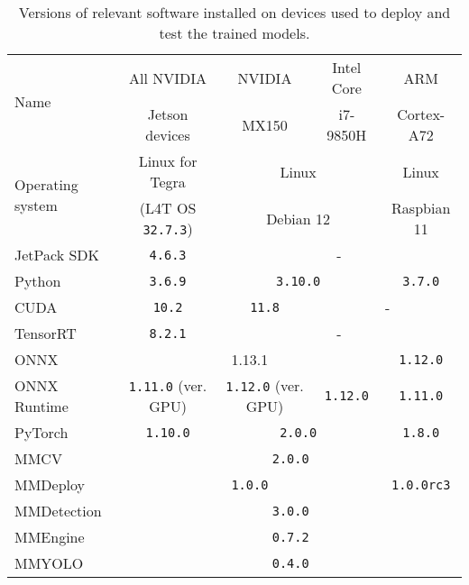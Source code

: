 \begin{table}[h]
\centering
\small
\begin{tabular}{|l|c|c|c|c|}
    \hline
    \multirow{2}{*}{Name} & All NVIDIA     & NVIDIA & Intel Core  & ARM \\
                          & Jetson devices & MX150  & i7-9850H    & Cortex-A72 \\
    \hline
    \multirow{2}{*}{Operating system} & Linux for Tegra             & \multicolumn{2}{c|}{Linux}     & Linux   \\
                                      & (L4T OS \texttt{32.7.3}) & \multicolumn{2}{c|}{Debian 12} & Raspbian 11   \\
    \hline
    JetPack SDK      & \texttt{4.6.3}                     & \multicolumn{3}{c|}{-}  \\
    \hline
    Python           & \texttt{3.6.9}                     & \multicolumn{2}{c|}{\texttt{3.10.0}} & \texttt{3.7.0} \\
    \hline
    CUDA             & \texttt{10.2}                      & \texttt{11.8} & \multicolumn{2}{c|}{-} \\
    \hline
    TensorRT         & \texttt{8.2.1} & \multicolumn{3}{c|}{-}             \\
    \hline
    ONNX             & \multicolumn{3}{c|}{1.13.1} & \texttt{1.12.0}             \\
    \hline
    ONNX Runtime     & \texttt{1.11.0} (ver. GPU) & \texttt{1.12.0} (ver. GPU) & \texttt{1.12.0} & \texttt{1.11.0}            \\
    \hline
    PyTorch          & \texttt{1.10.0} & \multicolumn{2}{c|}{\texttt{2.0.0}} & \texttt{1.8.0} \\
    \hline
    MMCV             & \multicolumn{4}{c|}{\texttt{2.0.0}} \\
    \hline
    MMDeploy         & \multicolumn{3}{c|}{\texttt{1.0.0}} & \texttt{1.0.0rc3} \\
    \hline
    MMDetection      & \multicolumn{4}{c|}{\texttt{3.0.0}} \\
    \hline
    MMEngine         & \multicolumn{4}{c|}{\texttt{0.7.2}} \\
    \hline
    MMYOLO           & \multicolumn{4}{c|}{\texttt{0.4.0}} \\
    \hline
\end{tabular}
\caption{Versions of relevant software installed on devices used to deploy and test the trained models.}
\label{DevicesPackages}
\end{table}
